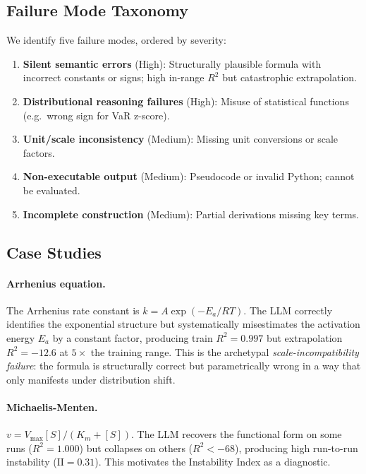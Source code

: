 \documentclass[twoside,11pt]{article}
\newcommand{\Rsq}{R^{2}}
\newcommand{\II}{\mathrm{II}}
\begin{document}
\subsection{Failure Mode Taxonomy}\label{subsec:failure-mode-taxonomy}
\label{sec:llm_failures}

We identify five failure modes, ordered by severity:
\begin{enumerate}
  \item \textbf{Silent semantic errors} (High): Structurally plausible formula with incorrect constants or signs; high in-range $\Rsq$ but catastrophic extrapolation.
  \item \textbf{Distributional reasoning failures} (High): Misuse of statistical functions (e.g.\ wrong sign for VaR z-score).
  \item \textbf{Unit/scale inconsistency} (Medium): Missing unit conversions or scale factors.
  \item \textbf{Non-executable output} (Medium): Pseudocode or invalid Python; cannot be evaluated.
  \item \textbf{Incomplete construction} (Medium): Partial derivations missing key terms.
\end{enumerate}

\subsection{Case Studies}\label{subsec:case-studies}
\label{sec:llm_cases}

\paragraph{Arrhenius equation.}
The Arrhenius rate constant is $k = A \exp\!(-E_a/RT)$. The LLM correctly identifies the exponential structure but systematically misestimates the activation energy $E_a$ by a constant factor, producing train $\Rsq = 0.997$ but extrapolation $\Rsq = -12.6$ at $5\times$ the training range. This is the archetypal \emph{scale-incompatibility failure}: the formula is structurally correct but parametrically wrong in a way that only manifests under distribution shift.

\paragraph{Michaelis-Menten.}
$v = V_{\max}[S]/(K_m + [S])$. The LLM recovers the functional form on some runs ($\Rsq = 1.000$) but collapses on others ($\Rsq < -68$), producing high run-to-run instability ($\II = 0.31$). This motivates the Instability Index as a diagnostic.
\end{document}
